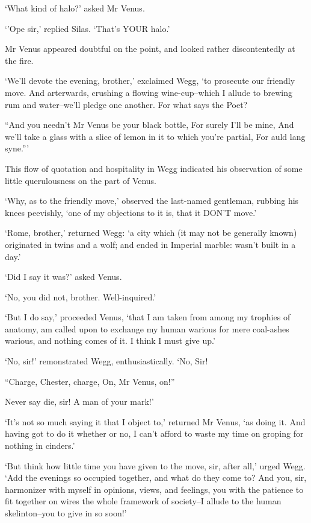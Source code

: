 ‘What kind of halo?’ asked Mr Venus.

‘’Ope sir,’ replied Silas. ‘That’s YOUR halo.’

Mr Venus appeared doubtful on the point, and looked rather
discontentedly at the fire.

‘We’ll devote the evening, brother,’ exclaimed Wegg, ‘to prosecute our
friendly move. And arterwards, crushing a flowing wine-cup--which I
allude to brewing rum and water--we’ll pledge one another. For what says
the Poet?

     “And you needn’t Mr Venus be your black bottle,
     For surely I’ll be mine,
     And we’ll take a glass with a slice of lemon in it to which
     you’re partial,
     For auld lang syne.”’

This flow of quotation and hospitality in Wegg indicated his observation
of some little querulousness on the part of Venus.

‘Why, as to the friendly move,’ observed the last-named gentleman,
rubbing his knees peevishly, ‘one of my objections to it is, that it
DON’T move.’

‘Rome, brother,’ returned Wegg: ‘a city which (it may not be generally
known) originated in twins and a wolf; and ended in Imperial marble:
wasn’t built in a day.’

‘Did I say it was?’ asked Venus.

‘No, you did not, brother. Well-inquired.’

‘But I do say,’ proceeded Venus, ‘that I am taken from among my trophies
of anatomy, am called upon to exchange my human warious for mere
coal-ashes warious, and nothing comes of it. I think I must give up.’

‘No, sir!’ remonstrated Wegg, enthusiastically. ‘No, Sir!

     “Charge, Chester, charge,
     On, Mr Venus, on!”

Never say die, sir! A man of your mark!’

‘It’s not so much saying it that I object to,’ returned Mr Venus, ‘as
doing it. And having got to do it whether or no, I can’t afford to waste
my time on groping for nothing in cinders.’

‘But think how little time you have given to the move, sir, after all,’
urged Wegg. ‘Add the evenings so occupied together, and what do they
come to? And you, sir, harmonizer with myself in opinions, views, and
feelings, you with the patience to fit together on wires the whole
framework of society--I allude to the human skelinton--you to give in so
soon!’

